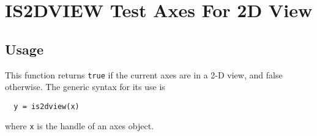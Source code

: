 \section{IS2DVIEW Test Axes For 2D View}

\subsection{Usage}

This function returns \verb|true| if the current axes are in a
2-D view, and false otherwise.  The generic syntax for its
use is
\begin{verbatim}
  y = is2dview(x)
\end{verbatim}
where \verb|x| is the handle of an axes object.

